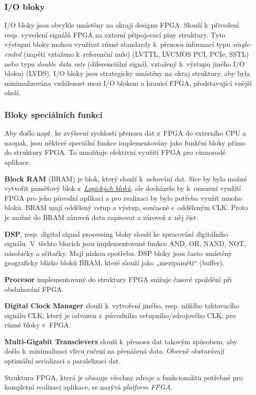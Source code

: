 \documentclass[a4paper, twoside, 11pt]{article}
\begin{document}
		\subsubsection{I/O bloky}
				I/O bloky jsou obvykle umístěny na okraji designu FPGA. Slouží k~přivedení resp. vyvedení signálů FPGA na externí připojovací piny struktury. Tyto výstupní bloky mohou využívat různé standardy k~přenosu informací typu \textit{single-ended} (napětí vztaženo k~referenční nule) (LVTTL, LVCMOS PCI, PCIe, SSTL) nebo typu \textit{double data rate} (diferenciální signál, vztažený k~výstupu jiného I/O bloku) (LVDS). I/O bloky jsou strategicky umístěny na okraj struktury, aby byla minimalizována vzdálenost mezi I/O blokem a hranicí FPGA, představující vnější okolí. \cite{Sass2010} \cite{pang-beginning-fpga}

		\subsubsection{Bloky speciálních funkcí}
			Aby došlo např. ke zvýšeení rychlosti přenosu dat z~FPGA do externího CPU a naopak, jsou některé speciální funkce implementovány jako funkční bloky přímo do struktury FPGA. To umožňuje efektivní využití FPGA pro různorodé aplikace. \cite{Sass2010}\par
			\textbf{Block RAM} (BRAM) je blok, který slouží k~uchování dat. Sice by bylo možné vytvořit paměťový blok z~\hyperref[subsubsec:logicke-bloky]{\textit{Logických bloků}}, ale docházelo by k~omezení využití FPGA pro jeho původní aplikaci a pro realizaci by bylo potřeba využít mnoho bloků. BRAM mají oddělený vstup a výstup, současně s~odděleným CLK. Proto je možné do BRAM zároveň data zapisovat a zároveň z~něj číst. \cite{Sass2010}\par
			\textbf{DSP}, resp. digital signal processing bloky slouží ke zpracování digitálního signálu. V~těchto blocích jsou implementované funkce AND, OR, NAND, NOT, násobičky a sčítačky. Mají nízkou spotřebu. DSP bloky jsou často umístěny geograficky blízko bloků BRAM, které slouží jako „mezipaměti“ (buffer). \cite{Sass2010}\par
			\textbf{Procesor} implementovaný do struktury FPGA snižuje časové zpoždění při obsluhování FPGA. \cite{Sass2010}\par
			\textbf{Digital Clock Manager} slouží k~vytvoření jiného, resp. nižšího taktovacího signálu CLK, který je odvozen z~původního vstupního/zdrojového CLK, pro různé bloky v~FPGA. \cite{Sass2010}\par
			\textbf{Multi-Gigabit Transcievers} slouží k~přenosu dat takovým způsobem, aby došlo k~minimalizaci vlivu ručení na přenášená data. Obecně obstarávají optimální serializaci a paralelizaci dat. \cite{Sass2010}\par
			Struktura FPGA, která je obsauje všechny zdroje a funkcionalitu potřebné pro kompletní realizaci aplikace, se nazývá \textit{platform FPGA}.
\end{document}
